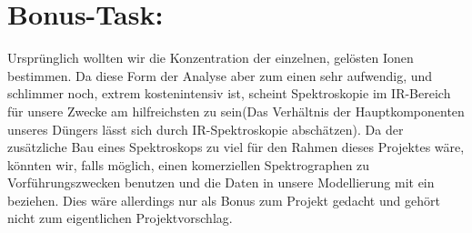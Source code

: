 \section*{Bonus-Task:}
Ursprünglich wollten wir die Konzentration der einzelnen, gelösten Ionen bestimmen.
Da diese Form der Analyse aber zum einen sehr aufwendig, und schlimmer noch, extrem kostenintensiv ist, scheint Spektroskopie im IR-Bereich für unsere Zwecke am hilfreichsten zu sein(Das Verhältnis der Hauptkomponenten unseres Düngers lässt sich durch IR-Spektroskopie abschätzen). Da der zusätzliche Bau eines Spektroskops zu viel für den Rahmen dieses Projektes wäre, könnten wir, falls möglich, einen komerziellen Spektrographen zu Vorführungszwecken benutzen und die Daten in unsere Modellierung mit ein beziehen. Dies wäre allerdings nur als Bonus zum Projekt gedacht und gehört nicht zum eigentlichen Projektvorschlag.
